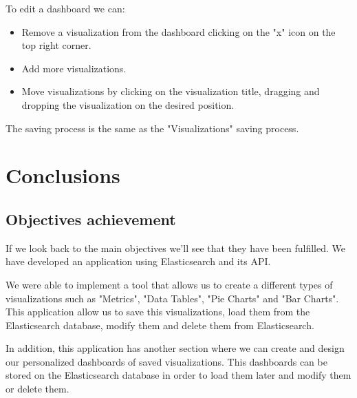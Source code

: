 \documentclass[a4paper, 12pt, english]{book}
\begin{document}
To edit a dashboard we can:
\begin{itemize}
    \item Remove a visualization from the dashboard clicking on the "x" icon on the top right corner.
    \item Add more visualizations.
    \item Move visualizations by clicking on the visualization title, dragging and dropping the visualization on the desired position.
\end{itemize}

The saving process is the same as the "Visualizations" saving process.





\cleardoublepage
\chapter{Conclusions}
\label{chap:conclusions}

\section{Objectives achievement}
\label{sec:objectives-achievement}

If we look back to the main objectives we'll see that they have been fulfilled. We have developed an application using Elasticsearch and its API.

We were able to implement a tool that allows us to create a different types of visualizations such as "Metrics", "Data Tables", "Pie Charts" and "Bar Charts". This application allow us to save this visualizations, load them from the Elasticsearch database, modify them and delete them from Elasticsearch.

In addition, this application has another section where we can create and design our personalized dashboards of saved visualizations. This dashboards can be stored on the Elasticsearch database in order to load them later and modify them or delete them.
\end{document}
